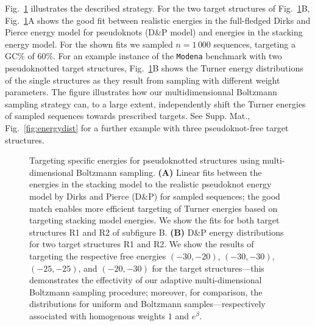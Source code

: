 \documentclass{bmcart}
\makeatletter
\newlength{\@aligneps}
\newcommand{\includegraphicstop}[2][]{%
\sbox{\@alignepsbox}{\texttt{[image: \#2]}}%
\setlength{\@aligneps}{-\ht\@alignepsbox}%
\addtolength{\@aligneps}{2ex}%
\raisebox{\@aligneps}{\usebox{\@alignepsbox}}}
\newcommand{\Nuc}[1]{{\sf #1}}
\newcommand{\Cb}{\Nuc{C}}
\newcommand{\Gb}{\Nuc{G}}
\newcommand{\GCb}{\Gb\Cb}
\makeatother
\begin{document}
Fig.~\ref{fig:energydist-pk} illustrates the described strategy. For
the two target structures of Fig.~\ref{fig:energydist-pk}B,
Fig.~\ref{fig:energydist-pk}A shows the good fit between realistic
energies in the full-fledged Dirks and Pierce energy model for
pseudoknots (D\&P model) and energies in the stacking energy
model. For the shown fits we sampled $n=1\,000$ sequences, targeting a
\GCb\% of $60\%$.
%
For an example instance of the \texttt{Modena} benchmark with two
pseudoknotted target structures, Fig.~\ref{fig:energydist-pk}B shows
the Turner energy distributions of the single structures as they
result from sampling with different weight parameters. The figure
illustrates how our multidimensionnal Boltzmann sampling strategy can,
to a large extent, independently shift the Turner energies of sampled
sequences towards prescribed targets. See Supp. Mat.,
Fig.~\ref{fig:energydist} for a further example with three
pseudoknot-free target structures.

\begin{figure}[t]
  \begin{center}
    \includegraphicstop[width=0.99\textwidth]{Figs/energy_shift}\hfill
  \end{center}
  \caption{%
    Targeting specific energies for pseudoknotted structures using
    multi-dimensional Boltzmann sampling. \textbf{(A)} Linear fits between the
    energies in the stacking model to the realistic pseudoknot energy
    model by Dirks and Pierce (D\&P) for sampled sequences; the good
    match enables more efficient targeting of Turner energies based on
    targeting stacking model energies.  We show the fits for both
    target structures R1 and R2 of subfigure B.  \textbf{(B)} D\&P energy
    distributions for two target structures R1 and R2. We show the
    results of targeting the respective free energies $(-30,-20)$,
    $(-30,-30)$, $(-25,-25)$, and $(-20,-30)$ for the target
    structures---this demonstrates the effectivity of our adaptive
    multi-dimensional Boltzmann sampling procedure; moreover, for
    comparison, the distributions for uniform and Boltzmann
    samples---respectively associated with homogenous weights $1$ and
    $e^\beta$.
  }
  \label{fig:energydist-pk}
\end{figure}
\end{document}
